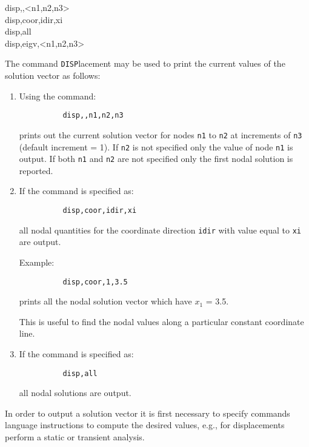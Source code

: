 \hspace{1.2cm} {{ disp,,<n1,n2,n3> \hfill}} \\{\smallskip}
\hspace{1.0cm} {{ disp,coor,idir,xi \hfill}} \\{\smallskip}
\hspace{1.0cm} {{ disp,all \hfill}} \\{\smallskip}
\hspace{1.0cm} {{ disp,eigv,<n1,n2,n3> \hfill}}
\headb

The command {\tt DISP}lacement may be used to print the
current values of the solution vector as follows:

\begin{enumerate}
\item{
Using the command:

\begin{verbatim}
          disp,,n1,n2,n3
\end{verbatim}
prints out the current solution vector for nodes
{\tt n1} to {\tt n2} at increments of {\tt n3} (default increment = 1).  If
{\tt n2} is not specified only the value of node {\tt n1} is
output.  If both {\tt n1} and {\tt n2} are not specified only
the first nodal solution is reported.}


\item{
If the command is specified as:

\begin{verbatim}
          disp,coor,idir,xi
\end{verbatim}
all nodal quantities for the coordinate direction {\tt idir}
with value equal to {\tt xi} are output.

Example: 
\begin{verbatim}
          disp,coor,1,3.5
\end{verbatim}
prints all the nodal solution vector which have $x_1$ = 3.5.

This is useful to find the nodal values along a particular
constant coordinate line.}

\item{
If the command is specified as:

\begin{verbatim}
          disp,all
\end{verbatim}
all nodal solutions are output.}
\end{enumerate}

In order to output a solution vector it is first necessary to
specify commands language instructions to compute the desired
values, e.g., for displacements perform a static or transient analysis.
\vfill\eject

